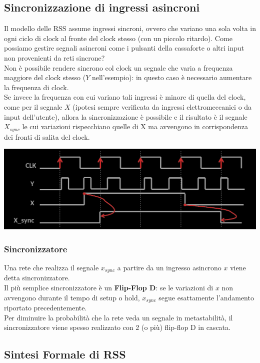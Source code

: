 \documentclass{article}
\begin{document}
\subsection{Sincronizzazione di ingressi asincroni}
Il modello delle RSS assume ingressi sincroni, ovvero che variano una sola volta in ogni ciclo di clock al fronte del clock stesso (con un piccolo ritardo). Come possiamo gestire segnali asincroni come i pulsanti della cassaforte o altri input non provenienti da reti sincrone?\\
Non è possibile rendere sincrono col clock un segnale che varia a frequenza maggiore del clock stesso ($Y$ nell’esempio): in questo caso è necessario aumentare la frequenza di clock.\\
Se invece la frequenza con cui variano tali ingressi è minore di quella del clock, come per il segnale $X$ (ipotesi sempre verificata da ingressi elettromeccanici o da input dell’utente), allora la sincronizzazione è possibile e il risultato è il segnale $X_{sync}$ le cui variazioni rispecchiano quelle di X ma avvengono in corrispondenza dei fronti di salita del clock.
\begin{center}
    \includegraphics[scale=0.35]{sincronizzazione.png}
\end{center}
\subsubsection{Sincronizzatore}
Una rete che realizza il segnale $x_{sync}$ a partire da un ingresso asincrono $x$ viene detta sincronizzatore.\\
Il più semplice sincronizzatore è un \textbf{Flip-Flop D}: se le variazioni di $x$ non avvengono durante il tempo di setup o hold, $x_{sync}$ segue esattamente l’andamento riportato precedentemente.
\vspace{0.2cm}\\
Per diminuire la probabilità che la rete veda un segnale in metastabilità, il sincronizzatore viene spesso realizzato con 2 (o più) flip-flop D in cascata.
\subsection{Sintesi Formale di RSS}
\end{document}
